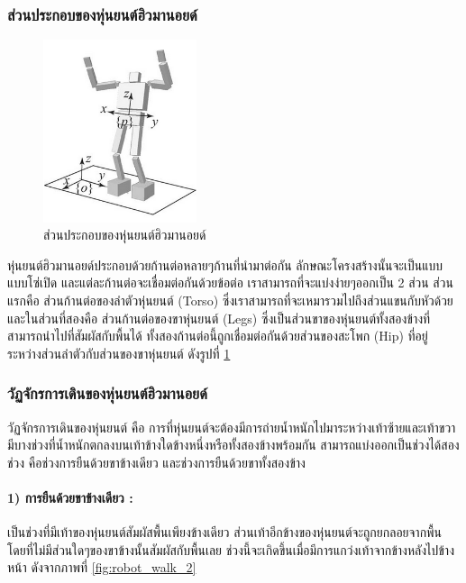 \subsubsection{ส่วนประกอบของหุ่นยนต์ฮิวมานอยด์}
\begin{figure}[htbp]
	\centering
	\includegraphics[width=0.4\textwidth]{chapter2/images/robot_component.png}
	\caption{ส่วนประกอบของหุ่นยนต์ฮิวมานอยด์}
	\label{fig:robot_component}
\end{figure}
หุ่นยนต์ฮิวมานอยด์ประกอบด้วยก้านต่อหลายๆก้านที่นำมาต่อกัน ลักษณะโครงสร้างนั้นจะเป็นแบบแบบโซ่เปิด
และแต่ละก้านต่อจะเชื่อมต่อกันด้วยข้อต่อ เราสามารถที่จะแบ่งง่ายๆออกเป็น 2 ส่วน ส่วนแรกคือ
ส่วนก้านต่อของลำตัวหุ่นยนต์ (Torso) ซึ่งเราสามารถที่จะเหมารวมไปถึงส่วนแขนกับหัวด้วย
และในส่วนที่สองคือ ส่วนก้านต่อของขาหุ่นยนต์ (Legs) ซึ่งเป็นส่วนขาของหุ่นยนต์ทั้งสองข้างที่สามารถนำไปที่สัมผัสกับพื้นได้
ทั้งสองก้านต่อนี้ถูกเชื่อมต่อกันด้วยส่วนของสะโพก (Hip) ที่อยู่ระหว่างส่วนลำตัวกับส่วนของขาหุ่นยนต์ ดังรูปที่ \ref{fig:robot_component}


\subsubsection{วัฏจักรการเดินของหุ่นยนต์ฮิวมานอยด์}
วัฏจักรการเดินของหุ่นยนต์ คือ การที่หุ่นยนต์จะต้องมีการถ่ายน้ำหนักไปมาระหว่างเท้าซ้ายและเท้าขวา
มีบางช่วงที่น้ำหนักตกลงบนเท้าข้างใดข้างหนึ่งหรือทั้งสองข้างพร้อมกัน สามารถแบ่งออกเป็นช่วงได้สองช่วง คือช่วงการยืนด้วยขาข้างเดียว
และช่วงการยืนด้วยขาทั้งสองข้าง

\paragraph*{1) การยืนด้วยขาข้างเดียว :}
เป็นช่วงที่มีเท้าของหุ่นยนต์สัมผัสพื้นเพียงข้างเดียว ส่วนเท้าอีกข้างของหุ่นยนต์จะถูกยกลอยจากพื้น
โดยที่ไม่มีส่วนใดๆของขาข้างนั้นสัมผัสกับพื้นเลย ช่วงนี้จะเกิดขึ้นเมื่อมีการแกว่งเท้าจากข้างหลังไปข้างหน้า
ดังจากภาพที่ \ref{fig:robot_walk_2}

